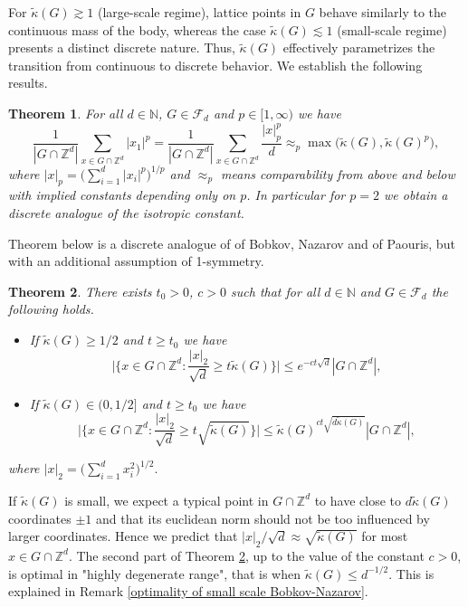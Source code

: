 \documentclass[a4paper,oneside, reqno]{amsart}
\numberwithin{equation}{section}
\newtheorem{Thm}{Theorem}[section]
\theoremstyle{definition}%
\theoremstyle{definition}
\theoremstyle{definition}%
\theoremstyle{definition}
\newcommand{\Z}{\mathbb{Z}}
\newcommand{\N}{\mathbb{N}}
\begin{document}
For $\widetilde{\kappa}(G) \gtrsim 1$ (large-scale regime), lattice points in $G$ behave similarly to the continuous mass of the body, whereas the case $\widetilde{\kappa}(G) \lesssim 1$ (small-scale regime) presents a distinct discrete nature. Thus, $\widetilde{\kappa}(G)$ effectively parametrizes the transition from continuous to discrete behavior.
We establish the following results.
\begin{Thm} \label{iso const}
For all $d \in \N$, $G \in \mathcal{F}_d$ and $p \in [1, \infty)$ we have 
\[
\frac{1}{|G \cap \Z^d|} \sum_{x \in G \cap \Z^d} |x_1|^p=\frac{1}{|G \cap \Z^d|} \sum_{x \in G \cap \Z^d} \frac{|x|_p^p}{d} \approx_p \max\Big(\widetilde{\kappa}(G),\widetilde{\kappa}(G)^p \Big),
\]
where $|x|_p=\Big(\sum_{i=1}^d |x_i|^p\Big)^{1/p}$ and $\approx_p$ means comparability from above and below with implied constants depending only on $p$.
In particular for $p=2$ we obtain a discrete analogue of the isotropic constant.
\end{Thm}
Theorem below is a discrete analogue of \cite[Theorem 1.2]{bob-naz} of Bobkov, Nazarov and \cite[Theorem 1.1]{Pa} of Paouris, but with an additional assumption of 1-symmetry.
\begin{Thm} \label{Bobkov-Nazarov main thm}
    There exists $t_0>0$, $c>0$ such that for all $d \in \N$ and $G \in \mathcal{F}_d$ the following holds.
    \begin{itemize}
        \item If $\widetilde{\kappa}(G) \ge 1/2$ and $t \ge t_0$ we have 
    \[
    \Big|\Big\{ x \in G \cap \Z^d: \frac{|x|_2}{\sqrt{d}} \ge t \widetilde{\kappa}(G) \Big\} \Big|  \le e^{-ct \sqrt{d}} |G \cap \Z^d|,
    \]
    \item If $\widetilde{\kappa}(G) \in (0, 1/2]$ and $t \ge t_0$ we have 
    \[
    \Big|\Big\{ x \in G \cap \Z^d: \frac{|x|_2}{\sqrt{d}} \ge t \sqrt{\widetilde{\kappa}(G) } \Big\} \Big|  \le  \widetilde{\kappa}(G)^{ ct\sqrt{d\widetilde{\kappa}(G)}} |G \cap \Z^d|,
    \]
    \end{itemize}
    where $|x|_2=\Big(\sum_{i=1}^d x_i^2\Big)^{1/2}.$
\end{Thm}
If $\widetilde{\kappa}(G)$ is small, we expect a typical point in $G \cap \Z^d$ to have close to $d \widetilde{\kappa}(G)$ coordinates $\pm 1$ and that its euclidean norm should not be too influenced by larger coordinates. Hence we predict that $|x|_2/ \sqrt{d} \approx \sqrt{\widetilde{\kappa}(G) }$ for most $x \in G \cap \Z^d$. The second part of Theorem \ref{Bobkov-Nazarov main thm}, up to the value of the constant $c>0$, is optimal in "highly degenerate range", that is when $\widetilde{\kappa}(G) \le d^{-1/2}$. This is explained in Remark \ref{optimality of small scale Bobkov-Nazarov}.
\end{document}
